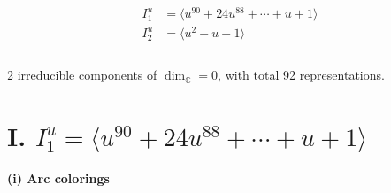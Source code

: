 \documentclass[1p]{elsarticle_modified}
\theoremstyle{definition}
\begin{document}
\begin{align*}
I^u_{1}&=\langle 
u^{90}+24 u^{88}+\cdots+u+1\rangle \\
I^u_{2}&=\langle 
u^2- u+1\rangle \\
\\
\end{align*}
\raggedright * 2 irreducible components of $\dim_{\mathbb{C}}=0$, with total 92 representations.\\
\newpage
\renewcommand{\arraystretch}{1}
\centering \section*{I. $I^u_{1}= \langle u^{90}+24 u^{88}+\cdots+u+1 \rangle$}
\flushleft \textbf{(i) Arc colorings}\\
\end{document}
